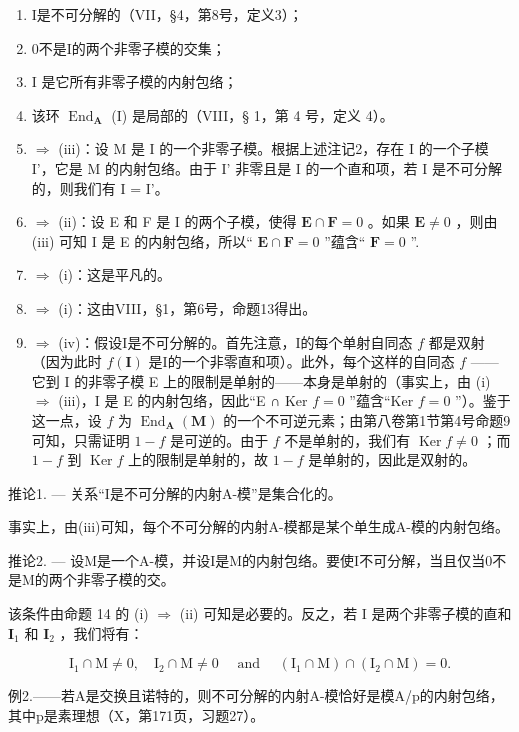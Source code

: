 \begin{enumerate}
\def\labelenumi{(\roman{enumi})}
\item
  I是不可分解的（VII，§4，第8号，定义3）；
\item
  0不是I的两个非零子模的交集；
\item
  I 是它所有非零子模的内射包络；
\item
  该环 \(\operatorname{End}_{\mathbf{A}}\) (I) 是局部的（VIII，§ 1，第 4 号，定义 4）。
\item
  \(\Rightarrow\) (iii)：设 M 是 I 的一个非零子模。根据上述注记2，存在 I 的一个子模 I'，它是 M 的内射包络。由于 I' 非零且是 I 的一个直和项，若 I 是不可分解的，则我们有 I = I'。
\item
  \(\Rightarrow\) (ii)：设 E 和 F 是 I 的两个子模，使得 \(\mathbf{E} \cap \mathbf{F} = 0\) 。如果 \(\mathbf{E} \neq 0\) ，则由 (iii) 可知 I 是 E 的内射包络，所以“ \(\mathbf{E} \cap \mathbf{F} = 0\) ”蕴含“ \(\mathbf{F} = 0\) ”.
\item
  \(\Rightarrow\) (i)：这是平凡的。
\item
  \(\Rightarrow\) (i)：这由VIII，§1，第6号，命题13得出。
\item
  \(\Rightarrow\) (iv)：假设I是不可分解的。首先注意，I的每个单射自同态 \(f\) 都是双射（因为此时 \(f(\mathbf{I})\) 是I的一个非零直和项）。此外，每个这样的自同态 \(f\) ——它到 I 的非零子模 E 上的限制是单射的——本身是单射的（事实上，由 (i) \(\Rightarrow\) (iii)，I 是 E 的内射包络，因此“E ∩ Ker \(f = 0\) ”蕴含“Ker \(f = 0\) ”）。鉴于这一点，设 \(f\) 为 \(\operatorname{End}_{\mathbf{A}}(\mathbf{M})\) 的一个不可逆元素；由第八卷第1节第4号命题9可知，只需证明 \(1 - f\) 是可逆的。由于 \(f\) 不是单射的，我们有 \(\operatorname{Ker} f \neq 0\) ；而 \(1 - f\) 到 \(\operatorname{Ker} f\) 上的限制是单射的，故 \(1 - f\) 是单射的，因此是双射的。
\end{enumerate}

推论1. --- 关系“I是不可分解的内射A-模”是集合化的。

事实上，由(iii)可知，每个不可分解的内射A-模都是某个单生成A-模的内射包络。

推论2. --- 设M是一个A-模，并设I是M的内射包络。要使I不可分解，当且仅当0不是M的两个非零子模的交。

该条件由命题 14 的 (i) \(\Rightarrow\) (ii) 可知是必要的。反之，若 I 是两个非零子模的直和 \(\mathbf{I}_1\) 和 \(\mathbf{I}_2\) ，我们将有：

\[
\mathrm{I} _ {1} \cap \mathrm{M} \neq 0, \quad \mathrm{I} _ {2} \cap \mathrm{M} \neq 0 \quad \text { and } \quad (\mathrm{I} _ {1} \cap \mathrm{M}) \cap (\mathrm{I} _ {2} \cap \mathrm{M}) = 0.
\]

例2.——若A是交换且诺特的，则不可分解的内射A-模恰好是模A/p的内射包络，其中p是素理想（X，第171页，习题27）。

